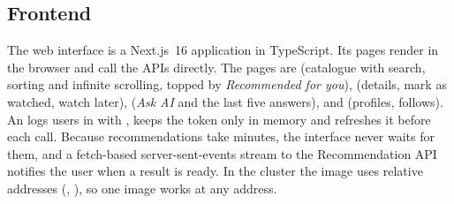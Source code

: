 \subsection{Frontend}\label{sec:frontend}
The web interface is a Next.js~16 application in TypeScript. Its pages render in the browser and call the APIs directly. The pages are  (catalogue with search, sorting and infinite scrolling, topped by \emph{Recommended for you}),  (details, mark as watched, watch later),  (\emph{Ask AI} and the last five answers),  and  (profiles, follows). An  logs users in with , keeps the token only in memory and refreshes it before each call. Because recommendations take minutes, the interface never waits for them, and a fetch-based server-sent-events stream to the Recommendation API notifies the user when a result is ready. In the cluster the image uses relative addresses (, ), so one image works at any address.
